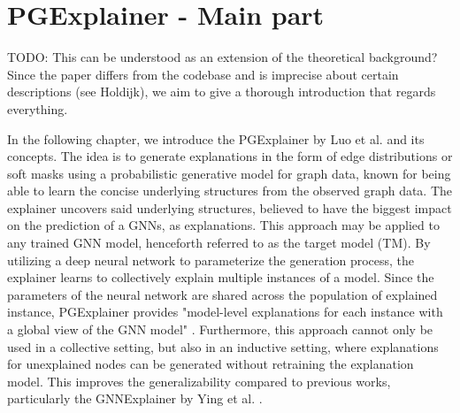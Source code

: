 \chapter{PGExplainer - Main part}
\label{ch:PGExplainer}
TODO: This can be understood as an extension of the theoretical background? Since the paper differs from the codebase and is imprecise about certain descriptions (see Holdijk), we aim to give a thorough introduction that regards everything.



In the following chapter, we introduce the PGExplainer by Luo et al. \cite{luo2020parameterized} and its concepts. The idea is to generate explanations in the form of edge distributions or soft masks using a probabilistic generative model for graph data, known for being able to learn the concise underlying structures from the observed graph data. The explainer uncovers said underlying structures, believed to have the biggest impact on the prediction of a GNNs, as explanations. This approach may be applied to any trained GNN model, henceforth referred to as the target model (TM). 
By utilizing a deep neural network to parameterize the generation process, the explainer learns to collectively explain multiple instances of a model. Since the parameters of the neural network are shared across the population of explained instance, PGExplainer provides "model-level explanations for each instance with a global view of the GNN model" \cite{luo2020parameterized}. Furthermore, this approach cannot only be used in a collective setting, but also in an inductive setting, where explanations for unexplained nodes can be generated without retraining the explanation model. This improves the generalizability compared to previous works, particularly the GNNExplainer by Ying et al. \cite{ying2019gnnexplainer}.

